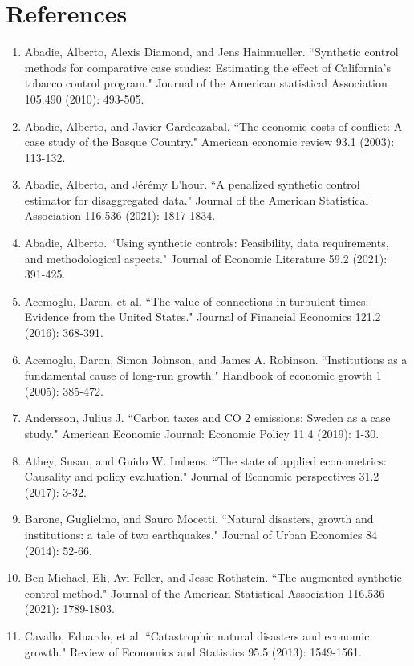 \documentclass[12pt,a4paper,draft]{article}
\begin{document}
\newpage



\section{References}  %
\begin{enumerate}
    \item Abadie, Alberto, Alexis Diamond, and Jens Hainmueller. ``Synthetic control methods for comparative case studies: Estimating the effect of California's tobacco control program." Journal of the American statistical Association 105.490 (2010): 493-505.
    \item Abadie, Alberto, and Javier Gardeazabal. ``The economic costs of conflict: A case study of the Basque Country." American economic review 93.1 (2003): 113-132.
    \item Abadie, Alberto, and Jérémy L'hour. ``A penalized synthetic control estimator for disaggregated data." Journal of the American Statistical Association 116.536 (2021): 1817-1834.
    \item Abadie, Alberto. ``Using synthetic controls: Feasibility, data requirements, and methodological aspects." Journal of Economic Literature 59.2 (2021): 391-425.
    \item Acemoglu, Daron, et al. ``The value of connections in turbulent times: Evidence from the United States." Journal of Financial Economics 121.2 (2016): 368-391.
    \item Acemoglu, Daron, Simon Johnson, and James A. Robinson. ``Institutions as a fundamental cause of long-run growth." Handbook of economic growth 1 (2005): 385-472.
    \item Andersson, Julius J. ``Carbon taxes and CO 2 emissions: Sweden as a case study." American Economic Journal: Economic Policy 11.4 (2019): 1-30.
    \item Athey, Susan, and Guido W. Imbens. ``The state of applied econometrics: Causality and policy evaluation." Journal of Economic perspectives 31.2 (2017): 3-32.
    \item Barone, Guglielmo, and Sauro Mocetti. ``Natural disasters, growth and institutions: a tale of two earthquakes." Journal of Urban Economics 84 (2014): 52-66.
    \item Ben-Michael, Eli, Avi Feller, and Jesse Rothstein. ``The augmented synthetic control method." Journal of the American Statistical Association 116.536 (2021): 1789-1803.
    \item Cavallo, Eduardo, et al. ``Catastrophic natural disasters and economic growth." Review of Economics and Statistics 95.5 (2013): 1549-1561.

\end{enumerate}
\end{document}
